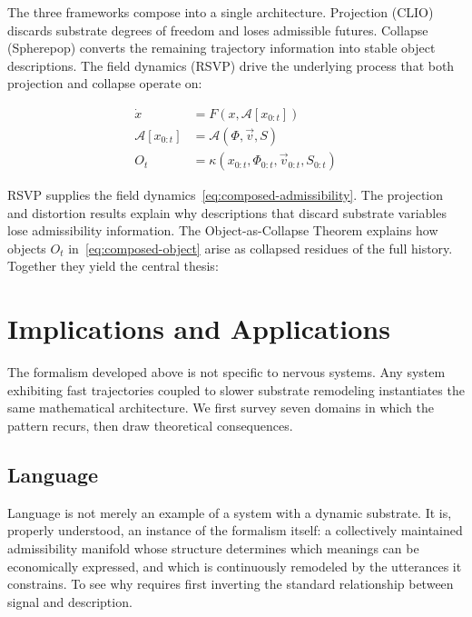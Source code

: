 \documentclass[12pt,a4paper]{article}
\begin{document}
The three frameworks compose into a single architecture. Projection (CLIO) discards substrate degrees of freedom and loses admissible futures. Collapse (Spherepop) converts the remaining trajectory information into stable object descriptions. The field dynamics (RSVP) drive the underlying process that both projection and collapse operate on:

\begin{align}
\dot{x} &= F(x, \mathcal{A}[x_{0:t}]) \label{eq:composed-fast}\\
\mathcal{A}[x_{0:t}] &= \mathcal{A}(\Phi, \vec{v}, S) \label{eq:composed-admissibility}\\
O_t &= \kappa(x_{0:t}, \Phi_{0:t}, \vec{v}_{0:t}, S_{0:t}) \label{eq:composed-object}
\end{align}

RSVP supplies the field dynamics~\eqref{eq:composed-admissibility}. The projection and distortion results explain why descriptions that discard substrate variables lose admissibility information. The Object-as-Collapse Theorem explains how objects $O_t$ in~\eqref{eq:composed-object} arise as collapsed residues of the full history. Together they yield the central thesis:

\begin{center}
\end{center}

\section{Implications and Applications}
\label{sec:domains}

The formalism developed above is not specific to nervous systems. Any system exhibiting fast trajectories coupled to slower substrate remodeling instantiates the same mathematical architecture. We first survey seven domains in which the pattern recurs, then draw theoretical consequences.

\subsection{Language}

Language is not merely an example of a system with a dynamic substrate. It is, properly understood, an instance of the formalism itself: a collectively maintained admissibility manifold whose structure determines which meanings can be economically expressed, and which is continuously remodeled by the utterances it constrains. To see why requires first inverting the standard relationship between signal and description.
\end{document}
